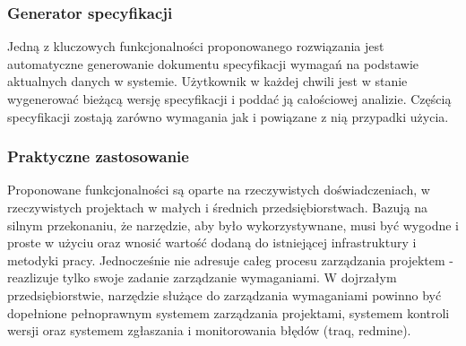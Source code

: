     \subsubsection{Generator specyfikacji}
      Jedną z kluczowych funkcjonalności proponowanego rozwiązania jest automatyczne generowanie dokumentu specyfikacji wymagań na podstawie aktualnych danych w systemie.
      Użytkownik w każdej chwili jest w stanie wygenerować bieżącą wersję specyfikacji i poddać ją całościowej analizie. Częścią specyfikacji zostają zarówno wymagania jak i powiązane z nią przypadki użycia.

    \subsubsection{Praktyczne zastosowanie}
      Proponowane funkcjonalności są oparte na rzeczywistych doświadczeniach, w rzeczywistych projektach w małych i średnich przedsiębiorstwach. Bazują na silnym przekonaniu, że narzędzie, aby było wykorzystywnane, musi być wygodne i proste w użyciu oraz wnosić wartość dodaną do istniejącej infrastruktury i metodyki pracy. Jednocześnie nie adresuje całeg procesu zarządzania projektem - reazlizuje tylko swoje zadanie zarządzanie wymaganiami. W dojrzałym przedsiębiorstwie, narzędzie służące do zarządzania wymaganiami powinno być dopełnione pełnoprawnym systemem zarządzania projektami, systemem kontroli wersji oraz systemem zgłaszania i monitorowania błędów (traq, redmine).
